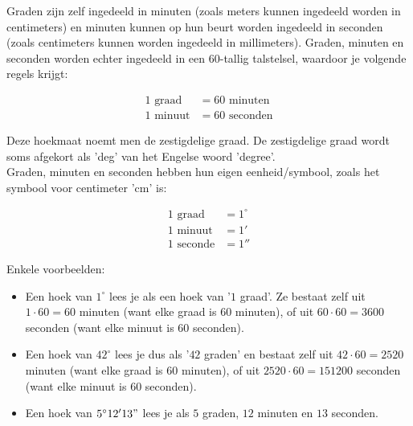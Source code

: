 

Graden zijn zelf ingedeeld in minuten (zoals meters kunnen ingedeeld worden in centimeters) en minuten kunnen op hun beurt worden ingedeeld in seconden (zoals centimeters kunnen worden ingedeeld in millimeters).  Graden, minuten en seconden worden echter ingedeeld in een $60$-tallig talstelsel, waardoor je volgende regels krijgt:

\begin{align*}
	1 \textrm{ graad} &= 60 \textrm{ minuten}\\
	1 \textrm{ minuut} &= 60 \textrm{ seconden}
\end{align*}

Deze hoekmaat noemt men de zestigdelige graad. De zestigdelige graad wordt soms afgekort als 'deg' van het Engelse woord 'degree'.\\
Graden, minuten en seconden hebben hun eigen eenheid/symbool, zoals het symbool voor centimeter 'cm' is:

\begin{align*}
	1 \textrm{ graad} &= 1^\circ\\
	1 \textrm{ minuut} &= 1'\\
	1 \textrm{ seconde} &= 1''
\end{align*}

Enkele voorbeelden:

\begin{itemize}
	\item Een hoek van $1^\circ$ lees je als een hoek van '$1$ graad'. Ze bestaat zelf uit $1\cdot 60 = 60$ minuten (want elke graad is $60$ minuten), of uit $60 \cdot 60 = 3600$ seconden (want elke minuut is $60$ seconden).
	\item Een hoek van $42^\circ$ lees je dus als '$42$ graden' en bestaat zelf uit $42 \cdot 60 = 2520$ minuten (want elke graad is $60$ minuten), of uit $2520 \cdot 60 = 151200$ seconden (want elke minuut is $60$ seconden).
	\item Een hoek van $5^\circ12'13"$ lees je als $5$ graden, $12$ minuten en $13$ seconden.
\end{itemize}

